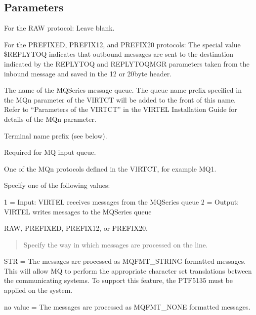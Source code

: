 \documentclass[letterpaper,10pt,english]{sphinxmanual}
\begin{document}
\subsection{Parameters}
\label{\detokenize{connectivity_guide:index-29}}\label{\detokenize{connectivity_guide:id8}}\begin{description}
\sphinxAtStartPar
For the RAW protocol: Leave blank.

\sphinxAtStartPar
For the PREFIXED, PREFIX12, and PREFIX20 protocols: The special
value \$REPLYTOQ indicates that outbound messages are sent to the
destination indicated by the REPLYTOQ and REPLYTOQMGR parameters
taken from the inbound message and saved in the 12\sphinxhyphen{} or 20\sphinxhyphen{}byte
header.

\sphinxAtStartPar
The name of the MQSeries message queue. The queue name prefix
specified in the MQn parameter of the VIRTCT will be added to the
front of this name. Refer to “Parameters of the VIRTCT” in the
VIRTEL Installation Guide for details of the MQn parameter.

\sphinxAtStartPar
Terminal name prefix (see below).

\sphinxAtStartPar
Required for MQ input queue.

\sphinxAtStartPar
One of the MQn protocols defined in the VIRTCT, for example MQ1.

\sphinxAtStartPar
Specify one of the following values:

\sphinxAtStartPar
\sphinxhyphen{}1 = Input: VIRTEL receives messages from the MQSeries queue
\sphinxhyphen{}2 = Output: VIRTEL writes messages to the MQSeries queue

\sphinxAtStartPar
RAW, PREFIXED, PREFIX12, or PREFIX20.

\begin{quote}

\sphinxAtStartPar
Specify the way in which messages are processed on the line.
\end{quote}

\sphinxAtStartPar
\sphinxhyphen{}STR = The messages are processed as MQFMT\_STRING formatted messages. This will allow MQ to perform the appropriate character set translations between the communicating systems. To support this feature, the PTF5135 must be applied on the system.

\sphinxAtStartPar
\sphinxhyphen{}no value = The messages are processed as MQFMT\_NONE formatted messages.

\end{description}
\end{document}
